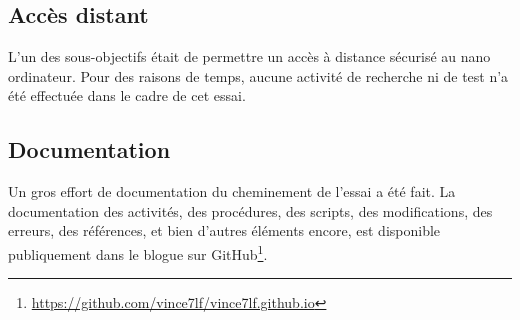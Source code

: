 \subsection{Accès distant}
\noindent L'un des sous-objectifs était de permettre un accès à distance sécurisé au nano ordinateur. Pour des raisons de temps, aucune activité de recherche ni de test n'a été effectuée dans le cadre de cet essai. 
\subsection{Documentation}
\noindent Un gros effort de documentation du cheminement de l'essai a été fait. La documentation des activités, des procédures, des scripts, des modifications, des erreurs, des références, et bien d'autres éléments encore, est disponible publiquement dans le blogue sur GitHub\footnote{\url{https://github.com/vince7lf/vince7lf.github.io}}.